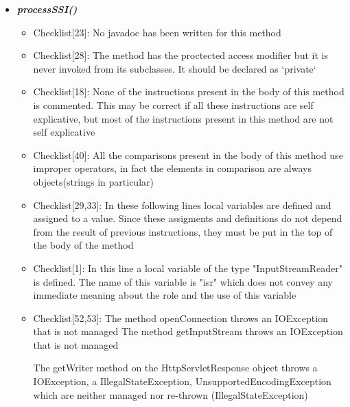 \documentclass[11pt,titlepage]{article} %
\begin{document}
\begin{itemize}
   \item \textbf{\textit{processSSI()}}
    \begin{itemize}
     \item Checklist[23]: No javadoc has been written for this method
     \item Checklist[28]: The method has the proctected access modifier but it is never invoked from its subclasses. \newline It should be declared as `private`
     \item Checklist[18]: None of the instructions present in the body of this method is commented. This may be
      correct if all these instructions are self explicative, but most of the instructions
      present in this method are not self explicative
    \item Checklist[40]: All the comparisons present in the body of this method use improper operators, in fact the elements in comparison are always objects(strings in particular)
     \item Checklist[29,33]: In these following lines
      local variables are defined and assigned to a value. Since these assigments and definitions
      do not depend from the result of previous instructions, they must be put in the top
      of the body of the method
      
      
     \item Checklist[1]:
      In this line a local variable of the type "InputStreamReader" is defined. The name of
      this variable is "isr" which does not convey any immediate meaning about the role and the
      use of this variable
      

     \item Checklist[52,53]:
      The method openConnection throws an IOException that is not managed\newline
      The method getInputStream throws an IOException that is not managed\newline\newline
      
      The getWriter method on the HttpServletResponse object throws a IOException, a IllegalStateException, UnsupportedEncodingException
      which are neither managed nor re-thrown (IllegalStateException)
      
      


\end{itemize}
\end{itemize}
\end{document}
